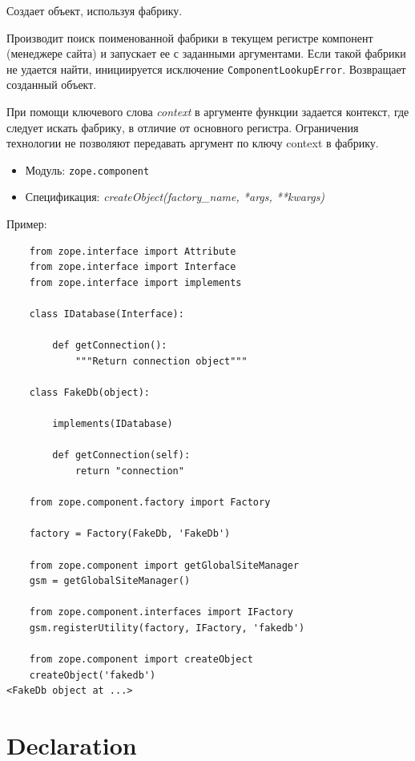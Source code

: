 \documentclass[a4paper,openany,twoside,final]{book}
\providecommand*{\DUroletitlereference}[1]{\textsl{#1}}
\begin{document}
Создает объект, используя фабрику.

Производит поиск поименованной фабрики в текущем регистре компонент (менеджере сайта) и запускает ее с заданными аргументами.  Если такой фабрики не удается найти, инициируется исключение \texttt{ComponentLookupError}.  Возвращает созданный объект.

При помощи ключевого слова \DUroletitlereference{context} в аргументе функции задается контекст, где следует искать фабрику, в отличие от основного регистра.  Ограничения технологии не позволяют передавать аргумент по ключу \textquotedbl{}context\textquotedbl{} в фабрику.

\begin{itemize}

\item Модуль: \texttt{zope.component}

\item Спецификация: \DUroletitlereference{createObject(factory\_name, *args, **kwargs)}

\end{itemize}

Пример:

\begin{verbatim}
    from zope.interface import Attribute
    from zope.interface import Interface
    from zope.interface import implements

    class IDatabase(Interface):

        def getConnection():
            """Return connection object"""

    class FakeDb(object):

        implements(IDatabase)

        def getConnection(self):
            return "connection"

    from zope.component.factory import Factory

    factory = Factory(FakeDb, 'FakeDb')

    from zope.component import getGlobalSiteManager
    gsm = getGlobalSiteManager()

    from zope.component.interfaces import IFactory
    gsm.registerUtility(factory, IFactory, 'fakedb')

    from zope.component import createObject
    createObject('fakedb')
<FakeDb object at ...>
\end{verbatim}


\section*{Declaration%
  \label{declaration}%
}
\end{document}
